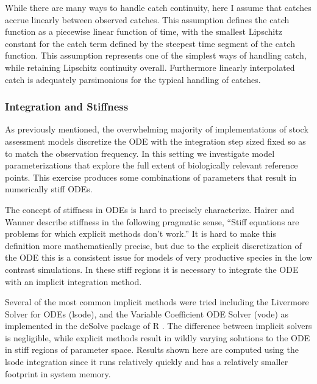 %
While there are many ways to handle catch continuity, here I assume that catches 
accrue linearly between observed catches. This assumption defines the catch
function as a piecewise linear function of time, with the smallest Lipschitz
constant for the catch term defined by the steepest time segment of the catch
function. This assumption represents one of the simplest ways of handling catch,
while retaining Lipschitz continuity overall. Furthermore linearly interpolated
catch is adequately parsimonious for the typical handling of catches.

%
\subsubsection{Integration and Stiffness}

%
As previously mentioned, the overwhelming majority of implementations of
stock assessment models discretize the ODE %
with the integration step sized fixed so as to match the observation frequency. 
In this setting we investigate model parameterizations that explore the full 
extent of biologically relevant reference points. This exercise produces 
some combinations of parameters that result in numerically stiff ODEs.

%
The concept of stiffness in ODEs is hard to precisely characterize.
Hairer and Wanner \cite[p.2]{wanner_solving_1996} describe stiffness in the
following pragmatic sense, ``Stiff equations are problems for which explicit
methods don't work.'' It is hard to make this definition more mathematically
precise, but due to the explicit discretization of the ODE this is a consistent 
issue for models of very productive species in the low contrast simulations. 
In these stiff regions it is necessary to integrate the ODE with an implicit integration method.

%
Several of the most common implicit methods were tried including the
Livermore Solver for ODEs (lsode), and the Variable Coefficient ODE Solver
(vode) as implemented in the deSolve package of R \cite{soetaert_solving_2010}.
The difference between implicit solvers is negligible, while explicit
methods result in wildly varying solutions to the ODE in stiff regions of
parameter space. %
Results shown here are computed using the lsode integration %
since it runs relatively quickly and has a relatively smaller footprint in system memory.

